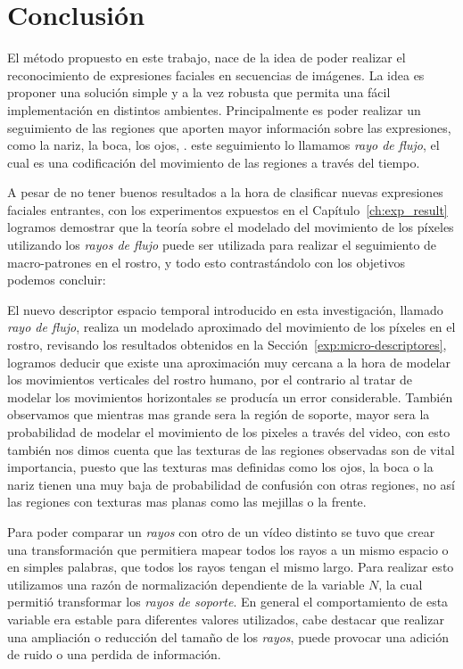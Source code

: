 \chapter[Conclusión]{Conclusión}
\label{ch:conclusion}

El método propuesto en este trabajo, nace de la idea de poder realizar el reconocimiento de expresiones faciales en secuencias de imágenes. La idea es proponer una solución simple y a la vez robusta que permita una fácil implementación en distintos ambientes. Principalmente es poder realizar un seguimiento de las regiones que aporten mayor información sobre las expresiones, como la nariz, la boca, los ojos, \etc. este seguimiento lo llamamos \textit{rayo de flujo}, el cual es una codificación del movimiento de las regiones a través del tiempo.

A pesar de no tener buenos resultados a la hora de clasificar nuevas expresiones faciales entrantes, con los experimentos expuestos en el Capítulo~\ref{ch:exp_result} logramos demostrar que la teoría sobre el modelado del movimiento de los píxeles utilizando los \textit{rayos de flujo} puede ser utilizada para realizar el seguimiento de macro-patrones en el rostro, y todo esto contrastándolo con los objetivos podemos concluir:

El nuevo descriptor espacio temporal introducido en esta investigación, llamado \textit{rayo de flujo}, realiza un modelado aproximado del movimiento de los píxeles en el rostro, revisando los resultados obtenidos en la Sección~\ref{exp:micro-descriptores}, logramos deducir que existe una aproximación muy cercana a la hora de modelar los movimientos verticales del rostro humano, por el contrario al tratar de modelar los movimientos horizontales se producía un error considerable. También observamos que mientras mas grande sera la región de soporte, mayor sera la probabilidad de modelar el movimiento de los pixeles a través del video, con esto también nos dimos cuenta que las texturas de las regiones observadas son de vital importancia, puesto que las texturas mas definidas como los ojos, la boca o la nariz tienen una muy baja de probabilidad de confusión con otras regiones, no así las regiones con texturas mas planas como las mejillas o la frente.

Para poder comparar un \textit{rayos} con otro de un vídeo distinto se tuvo que crear una transformación que permitiera mapear todos los rayos a un mismo espacio o en simples palabras, que todos los rayos tengan el mismo largo. Para realizar esto utilizamos una razón de normalización dependiente de la variable $N$, la cual permitió transformar los \textit{rayos de soporte}. En general el comportamiento de esta variable era estable para diferentes valores utilizados, cabe destacar que realizar una ampliación o reducción del tamaño de los \textit{rayos}, puede provocar una adición de ruido o  una perdida de información. 

